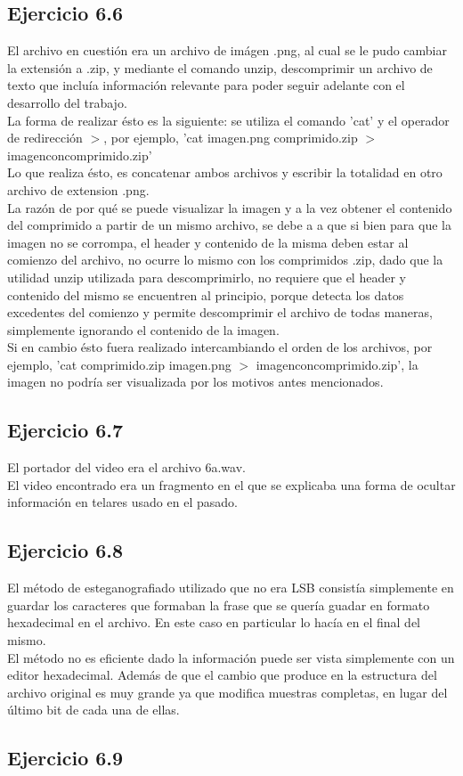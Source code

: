 \documentclass{article}
\begin{document}
\subsection{Ejercicio 6.6}
\noindent El archivo en cuestión era un archivo de imágen .png, al cual se le pudo cambiar la extensión a .zip, y mediante el comando unzip, descomprimir un archivo de texto que incluía información relevante para poder seguir adelante con el desarrollo del trabajo.\\
La forma de realizar ésto es la siguiente: se utiliza el comando 'cat' y el operador de redirección $>$, por ejemplo, 'cat imagen.png comprimido.zip $>$ imagenconcomprimido.zip'\\
\noindent Lo que realiza ésto, es concatenar ambos archivos y escribir la totalidad en otro archivo de extension .png. \\
\noindent La razón de por qué se puede visualizar la imagen y a la vez obtener el contenido del comprimido a partir de un mismo archivo, se debe a a que si bien para que la imagen no se corrompa, el header y contenido de la misma deben estar al comienzo del archivo, no ocurre lo mismo con los comprimidos .zip, dado que la utilidad unzip utilizada para descomprimirlo, no requiere que el header y contenido del mismo se encuentren al principio, porque detecta los datos excedentes del comienzo y permite descomprimir el archivo de todas maneras, simplemente ignorando el contenido de la imagen.\\
\noindent Si en cambio ésto fuera realizado intercambiando el orden de los archivos, por ejemplo, 'cat comprimido.zip imagen.png $>$ imagenconcomprimido.zip', la imagen no podría ser visualizada por los motivos antes mencionados.

\subsection{Ejercicio 6.7}

\noindent El portador del video era el archivo 6a.wav. \\ El video encontrado era un fragmento en el que se explicaba una forma de ocultar información en telares usado en el pasado.

\subsection{Ejercicio 6.8}

\noindent El método de esteganografiado utilizado que no era LSB consistía simplemente en guardar los caracteres que formaban la frase que se quería guadar en formato hexadecimal en el archivo. En este caso en particular lo hacía en el final del mismo.\\
El método no es eficiente dado la información puede ser vista simplemente con un editor hexadecimal. Además de que el cambio que produce en la estructura del archivo original es muy grande ya que modifica muestras completas, en lugar del último bit de cada una de ellas.\\

\subsection{Ejercicio 6.9}
\end{document}

